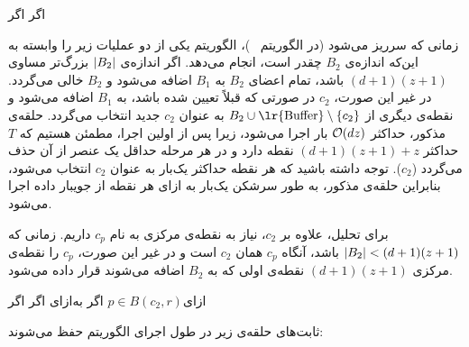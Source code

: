 ‌اگر{}
‌اگر{}

زمانی که  سرریز می‌شود (در الگوریتم ~)، الگوریتم یکی از دو عملیات زیر را وابسته به این‌که اندازه‌ی $B_2$ چقدر است، انجام می‌دهد.
اگر اندازه‌ی $\left|{B_2}\right|$ بزرگ‌تر مساوی $(d+1)(z+1)$ باشد، تمام اعضای $B_2$ به $B_1$ اضافه می‌شود و $B_2$ خالی می‌گردد.
در غیر این صورت، $c_2$ در صورتی که قبلاً تعیین شده باشد، به $B_1$ اضافه می‌شود و نقطه‌ی دیگری از $B_2 \cup \text{\lr{Buffer}} \setminus \set{c_2}$ به عنوان $c_2$ جدید انتخاب می‌گردد.
حلقه‌ی مذکور، حداکثر $\mathcal{O}(dz)$ بار اجرا می‌شود، زیرا پس از اولین اجرا، مطمئن هستیم که $T$ حداکثر $(d+1)(z+1) + z$ نقطه دارد و در هر مرحله حداقل یک عنصر از آن حذف می‌گردد ($c_2$).
توجه داشته باشید که هر نقطه حداکثر یک‌بار به عنوان $c_2$ انتخاب می‌شود، بنابراین حلقه‌ی مذکور، به طور سرشکن یک‌بار به ازای هر نقطه از جویبار داده اجرا می‌شود.

برای تحلیل، علاوه بر $c_2$، نیاز به نقطه‌ی مرکزی به نام $c_p$ داریم.
زمانی که $\left|{B_2}\right| < (d+1)(z+1)$ باشد، آنگاه $c_p$ همان $c_2$ است و در غیر این صورت، $c_p$ را نقطه‌ی مرکزی $(d+1)(z+1)$ نقطه‌ی اولی که به $B_2$ اضافه می‌شوند قرار داده می‌شود.

‌ازای{$p \in B(c_2, r)$}
‌اگر{}
‌به‌ازای{}
‌اگر{}
‌اگر{}



ثابت‌های حلقه‌ی زیر در طول اجرای الگوریتم حفظ می‌شوند:




